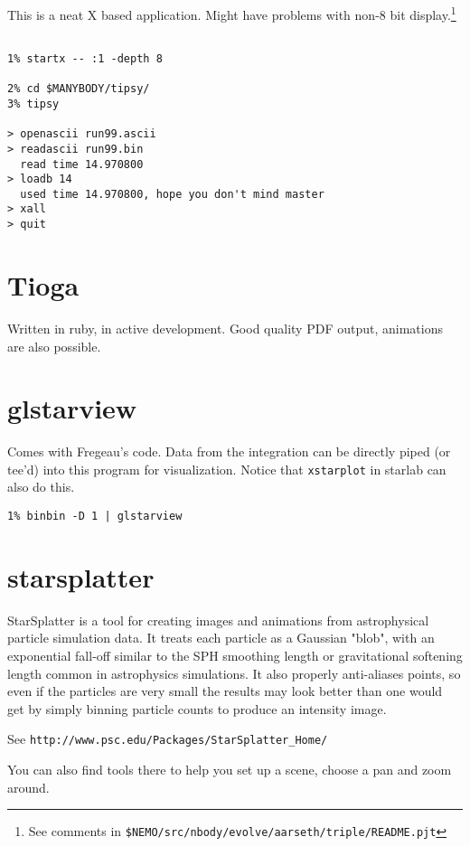 This is a neat X based application. Might have problems with non-8 bit 
display.\footnote{See comments in {\tt \$NEMO/src/nbody/evolve/aarseth/triple/README.pjt}}

\footnotesize\begin{verbatim}

1% startx -- :1 -depth 8

2% cd $MANYBODY/tipsy/
3% tipsy

> openascii run99.ascii
> readascii run99.bin
  read time 14.970800
> loadb 14
  used time 14.970800, hope you don't mind master
> xall
> quit
\end{verbatim}\normalsize



\section{Tioga}

Written in ruby, in active development. Good quality PDF output, animations are also possible.

\section{glstarview}

Comes with Fregeau's code. Data from the integration can be directly  piped
(or tee'd) into this program for visualization. Notice that {\tt xstarplot}
in starlab can also do this.

\footnotesize\begin{verbatim}
1% binbin -D 1 | glstarview
\end{verbatim}\normalsize


\section{starsplatter}

StarSplatter is a tool for creating images and animations from
astrophysical particle simulation data. It treats each particle as a
Gaussian "blob", with an exponential fall-off similar to the SPH
smoothing length or gravitational softening length common in
astrophysics simulations. It also properly anti-aliases points, so
even if the particles are very small the results may look better than
one would get by simply binning particle counts to produce an
intensity image.

See {\tt http://www.psc.edu/Packages/StarSplatter\_Home/}

You can also find tools there to help you set up a scene, choose a pan and
zoom around.

